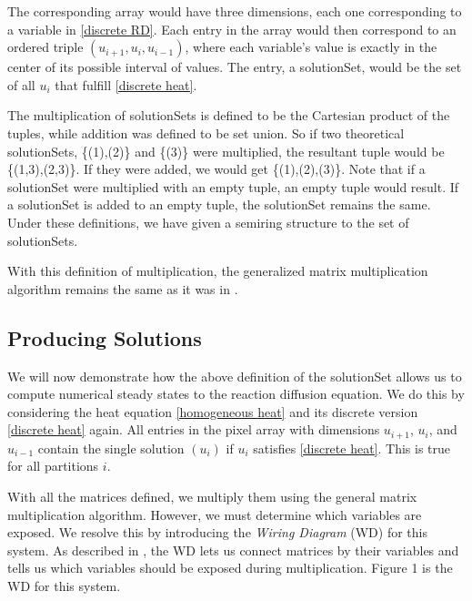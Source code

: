 \documentclass[11pt]{article}
\begin{document}
\noindent The corresponding array would have three dimensions, each one corresponding to a variable in \cref{discrete RD}. Each entry in the array would then correspond to an ordered triple $(u_{i+1}, u_i, u_{i-1})$, where each variable's value is exactly in the center of its possible interval of values. The entry, a solutionSet, would be the set of all $u_i$ that fulfill \cref{discrete heat}.

The multiplication of solutionSets is defined to be the Cartesian product of the tuples, while addition was defined to be set union. So if two theoretical solutionSets, \{(1),(2)\} and \{(3)\} were multiplied, the resultant tuple would be \{(1,3),(2,3)\}. If they were added, we would get \{(1),(2),(3)\}. Note that if a solutionSet were multiplied with an empty tuple, an empty tuple would result. If a solutionSet is added to an empty tuple, the solutionSet remains the same. Under these definitions, we have given a semiring structure to the set of solutionSets.

With this definition of multiplication, the generalized matrix multiplication algorithm remains the same as it was in \citep{Introduction_to_PA}.

\subsection{Producing Solutions}

We will now demonstrate how the above definition of the solutionSet allows us to compute numerical steady states to the reaction diffusion equation. We do this by considering the heat equation \eqref{homogeneous heat} and its discrete version \eqref{discrete heat} again. All entries in the pixel array with dimensions $u_{i+1}$, $u_i$, and $u_{i-1}$ contain the single solution ${(u_i)}$ if $u_i$ satisfies \cref{discrete heat}. This is true for all partitions $i$.

With all the matrices defined, we multiply them using the general matrix multiplication algorithm. However, we must determine which variables are exposed. We resolve this by introducing the \textit{Wiring Diagram} (WD) for this system. As described in \citep{Introduction_to_PA}, the WD lets us connect matrices by their variables and tells us which variables should be exposed during multiplication. Figure 1 is the WD for this system.
\end{document}

